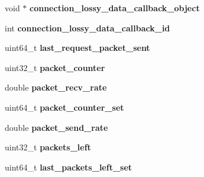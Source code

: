 \begin{DoxyCompactItemize}
\item 
\hypertarget{struct_crypto___connection_a70a99b7d0c9dd2f913ca9ea42bafc942}{void $\ast$ {\bfseries connection\+\_\+lossy\+\_\+data\+\_\+callback\+\_\+object}}\label{struct_crypto___connection_a70a99b7d0c9dd2f913ca9ea42bafc942}

\item 
\hypertarget{struct_crypto___connection_acdd49847729119bc5d6cc7269cde876a}{int {\bfseries connection\+\_\+lossy\+\_\+data\+\_\+callback\+\_\+id}}\label{struct_crypto___connection_acdd49847729119bc5d6cc7269cde876a}

\item 
\hypertarget{struct_crypto___connection_aa0c15e9ada39b9e8d1f27e2a10ad2e0e}{uint64\+\_\+t {\bfseries last\+\_\+request\+\_\+packet\+\_\+sent}}\label{struct_crypto___connection_aa0c15e9ada39b9e8d1f27e2a10ad2e0e}

\item 
\hypertarget{struct_crypto___connection_a253e0640ca1d914e479ea37e97d1ba12}{uint32\+\_\+t {\bfseries packet\+\_\+counter}}\label{struct_crypto___connection_a253e0640ca1d914e479ea37e97d1ba12}

\item 
\hypertarget{struct_crypto___connection_ae1c1fa0c995f0fab590b094baa769e8d}{double {\bfseries packet\+\_\+recv\+\_\+rate}}\label{struct_crypto___connection_ae1c1fa0c995f0fab590b094baa769e8d}

\item 
\hypertarget{struct_crypto___connection_a77c1105a8f0d4de4daab379a572bb11c}{uint64\+\_\+t {\bfseries packet\+\_\+counter\+\_\+set}}\label{struct_crypto___connection_a77c1105a8f0d4de4daab379a572bb11c}

\item 
\hypertarget{struct_crypto___connection_a8358768a02871910ed059b1b2646438e}{double {\bfseries packet\+\_\+send\+\_\+rate}}\label{struct_crypto___connection_a8358768a02871910ed059b1b2646438e}

\item 
\hypertarget{struct_crypto___connection_adfabcbe80305cc6b4e1c0dfef5c48653}{uint32\+\_\+t {\bfseries packets\+\_\+left}}\label{struct_crypto___connection_adfabcbe80305cc6b4e1c0dfef5c48653}

\item 
\hypertarget{struct_crypto___connection_a3c50560fad9a00689d5d3f143f4b56aa}{uint64\+\_\+t {\bfseries last\+\_\+packets\+\_\+left\+\_\+set}}\label{struct_crypto___connection_a3c50560fad9a00689d5d3f143f4b56aa}


\end{DoxyCompactItemize}
